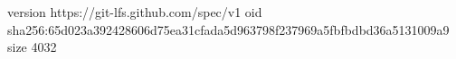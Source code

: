 version https://git-lfs.github.com/spec/v1
oid sha256:65d023a392428606d75ea31cfada5d963798f237969a5fbfbdbd36a5131009a9
size 4032
